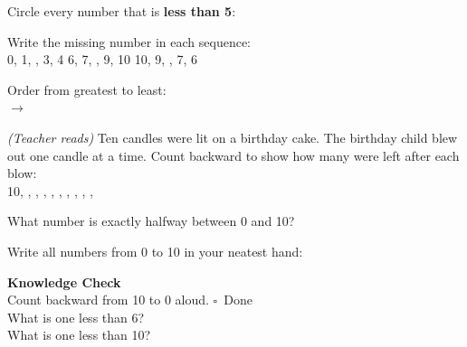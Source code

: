 \documentclass[12pt,letterpaper]{article}
\begin{document}
\vspace{10pt}
\prob Circle every number that is \textbf{less than 5}:\\[6pt]
\hspace{2cm}{\Large 7 \quad 2 \quad 9 \quad 0 \quad 4 \quad 6 \quad 3 \quad 10 \quad 1}

\vspace{10pt}
\prob Write the missing number in each sequence:\\[6pt]
\hspace{1cm}0, 1, \ansblank, 3, 4 \hspace{2cm}
6, 7, \ansblank, 9, 10 \hspace{2cm}
10, 9, \ansblank, 7, 6

\vspace{10pt}
\prob Order from greatest to least:\\[6pt]
\hspace{1cm}{\Large 3 \quad 10 \quad 1 \quad 8 \quad 5}\quad$\longrightarrow$\quad
\ansblank\quad\ansblank\quad\ansblank\quad\ansblank\quad\ansblank

\vspace{10pt}
\prob \textit{(Teacher reads)} Ten candles were lit on a birthday cake.
The birthday child blew out one candle at a time.
Count backward to show how many were left after each blow:\\[6pt]
\hspace{1cm}10, \ansblank, \ansblank, \ansblank, \ansblank, \ansblank, \ansblank, \ansblank, \ansblank, \ansblank, \ansblank

\vspace{10pt}
\prob What number is exactly halfway between 0 and 10? \quad\ansblank

\vspace{10pt}
\prob Write all numbers from 0 to 10 in your neatest hand:\\[8pt]
\noindent\fbox{\rule{0pt}{1.8cm}\hspace{12.5cm}}

\goldrule

\begin{checkbox}
\noindent\textbf{\color{sd-green}Knowledge Check}\\[4pt]
\setcounter{probnum}{0}
\prob Count backward from 10 to 0 aloud. \quad $\square$~Done\\[8pt]
\prob What is one less than 6? \quad\ansblank\\[8pt]
\prob What is one less than 10? \quad\ansblank
\end{checkbox}
\end{document}
